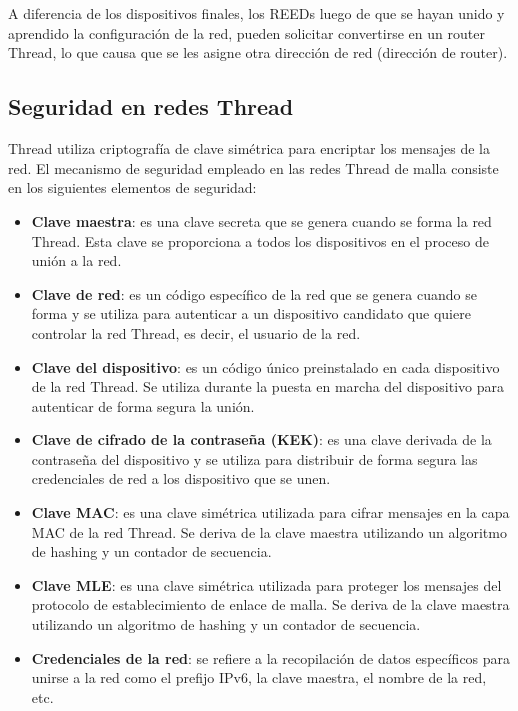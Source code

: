 \\\\
A diferencia de los dispositivos finales, los REEDs luego de que se hayan unido y aprendido la configuración de la red, pueden solicitar convertirse en un router Thread, lo que causa que se les asigne otra dirección de red (dirección de router).
\clearpage




\subsection{Seguridad en redes Thread} %
\label{seguridadredesthread}
Thread utiliza criptografía de clave simétrica para encriptar los mensajes de la red. El mecanismo de seguridad empleado en las redes Thread de malla consiste en los siguientes elementos de seguridad:
\begin{itemize}
\item {\bf Clave maestra}: es una clave secreta que se genera cuando se forma la red Thread. Esta clave se proporciona a todos los dispositivos en el proceso de unión a la red.
\item {\bf Clave de red}: es un código específico de la red que se genera cuando se forma y se utiliza para autenticar a un dispositivo candidato que quiere controlar la red Thread, es decir, el usuario de la red.
\item {\bf Clave del dispositivo}: es un código único preinstalado en cada dispositivo de la red Thread. Se utiliza durante la puesta en marcha del dispositivo para autenticar de forma segura la unión.
\item {\bf Clave de cifrado de la contraseña (KEK)}: es una clave derivada de la contraseña del dispositivo y se utiliza para distribuir de forma segura las credenciales de red a los dispositivo que se unen.
\item {\bf Clave MAC}: es una clave simétrica utilizada para cifrar mensajes en la capa MAC de la red Thread. Se deriva de la clave maestra utilizando un algoritmo de hashing y un contador de secuencia.
\item {\bf Clave MLE}: es una clave simétrica utilizada para proteger los mensajes del protocolo de establecimiento de enlace de malla. Se deriva de la clave maestra utilizando un algoritmo de hashing y un contador de secuencia. 
\item {\bf Credenciales de la red}: se refiere a la recopilación de datos específicos para unirse a la red como el prefijo IPv6, la clave maestra, el nombre de la red, etc.
\end{itemize}

